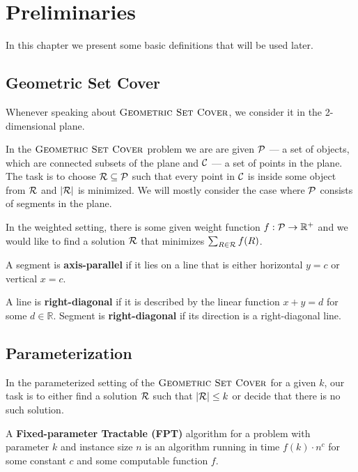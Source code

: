 \chapter{Preliminaries}

In this chapter we present some basic definitions that
will be used later.

\section{Geometric Set Cover}
\label{section:def:geometric__set_cover}
Whenever speaking about $\textsc{Geometric Set Cover}$,
we consider it in the 2-dimensional plane.

In the $\textsc{Geometric Set Cover}$ problem we are are given
$\mathcal{P}$ --- a set of objects, which are connected
subsets of the plane and $\mathcal{C}$ --- a set of points in the plane.
The task is to choose $\mathcal{R} \subseteq \mathcal{P}$ such that
every point in $\mathcal{C}$ is inside some object from $\mathcal{R}$
and $|\mathcal{R}|$ is minimized. We will mostly consider the case where
$\mathcal{P}$ consists of segments in the plane.

In the weighted setting, there is some given weight function
$f : \mathcal{P} \rightarrow \mathbb{R^+}$
and we would like to find a solution $\mathcal{R}$
that minimizes $\sum_{R \in \mathcal{R}} f(R)$.

\begin{defi}
A segment is \textbf{axis-parallel} if it lies on a line that is
either horizontal $y = c$ or vertical $x = c$.
\end{defi}

\begin{defi}
	A line is \textbf{right-diagonal} if it is
	described by the linear function $x + y = d$ for some $d \in \mathbb{R}$.
	Segment is \textbf{right-diagonal} if its
	direction is a right-diagonal line.
\end{defi}

\section{Parameterization}

In the parameterized setting of the $\textsc{Geometric Set Cover}$
for a given $k$,
our task is to either find a solution $\mathcal{R}$ such that $|\mathcal{R}| \le k$
or decide that there is no such solution.

\begin{defi}
A \textbf{Fixed-parameter Tractable (FPT)} algorithm 
for a problem with parameter $k$ and instance size $n$
is an algorithm running in time $f(k) \cdot n^c$
for some constant $c$ and some computable function $f$.
\end{defi}

